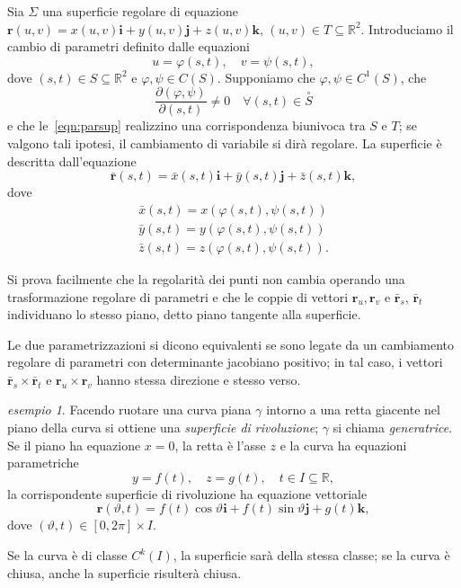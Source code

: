 \documentclass[a4paper]{book}
\numberwithin{equation}{section}
\renewcommand{\theta}{\vartheta}
\renewcommand{\phi}{\varphi}
\theoremstyle{plain}
\theoremstyle{definition}
\theoremstyle{remark}
\renewcommand{\vec}{\boldsymbol}
\theoremstyle{example}
\newtheorem{exmp}{esempio}[section]
\begin{document}
	Sia $\Sigma$ una superficie regolare di equazione $\vec{r}(u, v) = x(u, v)\vec{i} + y(u,v)\vec{j} + z(u,v)\vec{k}$, $(u ,v) \in T \subseteq \mathbb{R}^2$. Introduciamo il cambio di parametri definito dalle equazioni
		\begin{equation}
			\label{eqn:parsup}
			u = \phi(s, t), \quad v = \psi(s, t),
		\end{equation}
	dove $(s, t) \in S \subseteq \mathbb{R}^2$ e $\phi, \psi \in C(S)$. Supponiamo che $\phi, \psi \in C^1(S)$, che
		\begin{equation*}
			\frac{\partial (\phi, \psi)}{\partial (s, t)} \ne 0 \quad \forall (s, t) \in \overset{\circ}{S}
		\end{equation*}
	e che le~\eqref{eqn:parsup} realizzino una corrispondenza biunivoca tra $S$ e $T$; se valgono tali ipotesi, il cambiamento di variabile si dirà regolare. La superficie è descritta dall'equazione
		\begin{equation*}
			\bar{\vec{r}}(s, t) = \bar{x}(s, t)\vec{i}+\bar{y}(s, t)\vec{j}+\bar{z}(s, t)\vec{k},
		\end{equation*}
	dove
		\begin{gather*}
			\bar{x}(s, t) = x(\phi(s, t), \psi(s, t)) \\
			\bar{y}(s, t) = y(\phi(s, t), \psi(s, t)) \\
			\bar{z}(s, t) = z(\phi(s, t), \psi(s, t)).
		\end{gather*}

	Si prova facilmente che la regolarità dei punti non cambia operando una trasformazione regolare di parametri e che le coppie di vettori $\vec{r}_u, \vec{r}_v$ e $\bar{\vec{r}}_s$, $\bar{\vec{r}}_t$ individuano lo stesso piano, detto piano tangente alla superficie.

	Le due parametrizzazioni si dicono equivalenti se sono legate da un cambiamento regolare di parametri con determinante jacobiano positivo; in tal caso, i vettori $\bar{\vec{r}}_s \times \bar{\vec{r}}_t$ e $\vec{r}_u \times \vec{r}_v$ hanno stessa direzione e stesso verso.

	\begin{exmp}
Facendo ruotare una curva piana $\gamma$ intorno a una retta giacente nel piano della curva si ottiene una \emph{superficie di rivoluzione}; $\gamma$ si chiama \emph{generatrice}. Se il piano ha equazione $x= 0$, la retta è l'asse $z$ e la curva ha equazioni parametriche
	\begin{equation*}
		y = f(t), \quad z = g(t), \quad t \in I \subseteq \mathbb{R},
	\end{equation*}
la corrispondente superficie di rivoluzione ha equazione vettoriale
	\begin{equation}
		\vec{r}(\theta, t) = f(t)\cos\theta \vec{i}+f(t)\sin\theta\vec{j} + g(t) \vec{k},
	\end{equation}
dove $(\theta, t) \in [0, 2\pi] \times I$.
	\end{exmp} Se la curva è di classe $C^k(I)$, la superficie sarà della stessa classe; se la curva è chiusa, anche la superficie risulterà chiusa.
\end{document}
